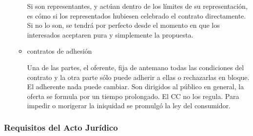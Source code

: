 \documentclass[]{article}
\begin{document}
\begin{itemize}
\begin{itemize}
    Si son representantes, y actúan dentro de los límites de su
    representación, es cómo si los representados hubiesen celebrado el
    contrato directamente. Si no lo son, se tendrá por perfecto desde el
    momento en que los interesados aceptaren pura y simplemente la
    propuesta.
  \item
    contratos de adhesión

    Una de las partes, el oferente, fija de antemano todas las
    condiciones del contrato y la otra parte sólo puede adherir a ellas
    o rechazarlas en bloque. El adherente nada puede cambiar. Son
    dirigidos al público en general, la oferta se formula por un tiempo
    prolongado. El CC no los regula. Para impedir o morigerar la
    iniquidad se promulgó la ley del consumidor.
  \end{itemize}
\end{itemize}

\hypertarget{requisitos-del-acto-juruxeddico}{%
\subsubsection{Requisitos del Acto
Jurídico}\label{requisitos-del-acto-juruxeddico}}
\end{document}

